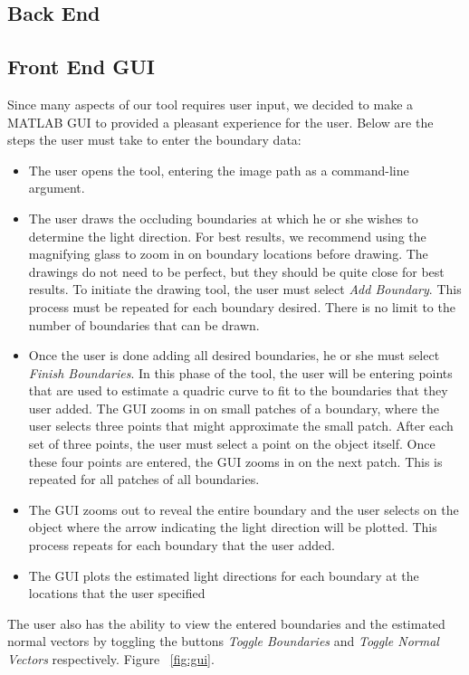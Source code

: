 \documentclass[10pt,twocolumn,letterpaper]{article}
\begin{document}
\subsection{Back End}

\subsection{Front End GUI}
Since many aspects of our tool requires user input, we decided to make a MATLAB GUI to provided a pleasant experience for the user. Below are the steps the user must take to enter the boundary data:
\begin{itemize}
\item The user opens the tool, entering the image path as a command-line argument.
\item The user draws the occluding boundaries at which he or she wishes to determine the light direction. For best results, we recommend using the magnifying glass to zoom in on boundary locations before drawing. The drawings do not need to be perfect, but they should be quite close for best results. To initiate the drawing tool, the user must select \emph{Add Boundary}. This process must be repeated for each boundary desired. There is no limit to the number of boundaries that can be drawn.
\item Once the user is done adding all desired boundaries, he or she must select \emph{Finish Boundaries}. In this phase of the tool, the user will be entering points that are used to estimate a quadric curve to fit to the boundaries that they user added. The GUI zooms in on small patches of a boundary, where the user selects three points that might approximate the small patch. After each set of three points, the user must select a point on the object itself. Once these four points are entered, the GUI zooms in on the next patch. This is repeated for all patches of all boundaries.
\item The GUI zooms out to reveal the entire boundary and the user selects on the object where the arrow indicating the light direction will be plotted. This process repeats for each boundary that the user added.
\item The GUI plots the estimated light directions for each boundary at the locations that the user specified
\end{itemize}
The user also has the ability to view the entered boundaries and the estimated normal vectors by toggling the buttons \emph{Toggle Boundaries} and \emph{Toggle Normal Vectors} respectively. Figure ~\ref{fig:gui}.
\end{document}
